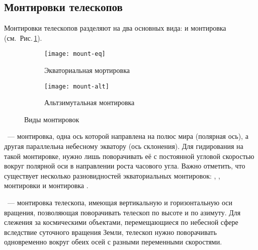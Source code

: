\subsection{Монтировки телескопов}
Монтировки телескопов разделяют на два основных вида:  и  монтировка (см.~Рис.\,\ref{mounts}).
\begin{figure}[h]
	\centering
	\hspace*{.4cm}
	\begin{subfigure}{0.48\textwidth}
		\texttt{[image: mount-eq]}
		\caption{Экваториальная мортировка}
	\end{subfigure}
	\hspace*{.4cm}
	\begin{subfigure}{0.41\textwidth}
		\texttt{[image: mount-alt]}
		\caption{Альтзимутальная монтировка}
	\end{subfigure}
	\hspace*{.4cm}
	\caption{Виды монтировок}
	\label{mounts}
\end{figure}

~--- монтировка, одна ось которой направлена на полюс мира (полярная ось), а другая параллельна небесному экватору (ось склонения).
Для гидирования на такой монтировке, нужно лишь поворачивать её с постоянной угловой скоростью вокруг полярной оси в направлении роста часового угла.
Важно отметить, что существует несколько разновидностей экваториальных монтировок: , ,  монтировки и монтировка .

~--- монтировка телескопа, имеющая вертикальную и горизонтальную оси вращения, позволяющая поворачивать телескоп по высоте и по азимуту. Для слежения за космическими объектами, перемещающиеся по небесной сфере вследствие суточного вращения Земли, телескоп нужно поворачивать одновременно вокруг обеих осей с разными переменными скоростями.
